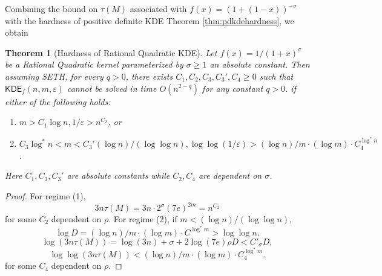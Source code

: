 \documentclass[10pt,a4paper]{article}
\newtheorem{theorem}{Theorem}
\theoremstyle{remark}
\numberwithin{equation}{section}
\numberwithin{theorem}{section}
\newcommand{\eps}{\varepsilon}
\newcommand{\KDE}{\mathsf{KDE}}
\begin{document}
Combining the bound on $\tau(M)$ associated with $f(x) = (1 + (1-x))^{-\sigma}$ with the hardness of positive definite KDE Theorem \ref{thm:pdkdehardness}, we obtain

\begin{theorem}[Hardness of Rational Quadratic KDE]
Let $f(x) = 1/(1+x)^\sigma$ be a Rational Quadratic kernel parameterized by $\sigma \ge 1$ an absolute constant.
Then assuming SETH, for every $q > 0$, there exists $C_1, C_2, C_3, C_3', C_4 \ge 0$ such that $\KDE_f(n, m, \eps)$ cannot be solved in time $O(n^{2-q})$ for any constant $q>0$. if either of the following holds:
\begin{enumerate}[(1)]
\item $m > C_1\log n, 1/\eps > n^{C_2}$, or
\item $C_3\log^* n < m < C_3'(\log n)/(\log\log n), \log\log(1/\eps) > (\log n)/m \cdot (\log m) \cdot C_4^{\log^*n}$.
\end{enumerate}
Here $C_1, C_3, C_3'$ are absolute constants while $C_2, C_4$ are dependent on $\sigma$.
\end{theorem}

\begin{proof}
For regime (1), 
\[3n\tau(M) = 3n\cdot 2^{\sigma}(7e)^{2m} = n^{C_2}\]
for some $C_2$ dependent on $\rho$. For regime (2), if $m < (\log n)/(\log \log n)$,
\[\log D = (\log n)/m \cdot (\log m) \cdot C^{\log^* m} > \log \log n.\]
\[\log(3n\tau(M)) = \log(3n) + \sigma + 2\log(7e)\rho D < C'_\sigma D,\]
\[\log\log(3n\tau(M)) < (\log n)/m \cdot (\log m) \cdot C_4^{\log^* m}.\]
for some $C_4$ dependent on $\rho$.
\end{proof}
\end{document}

